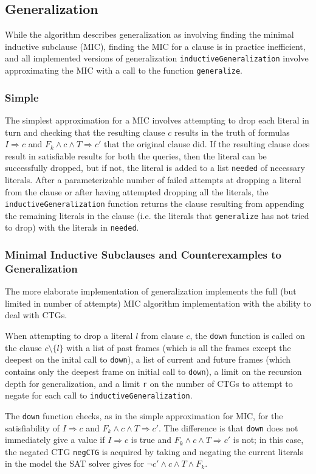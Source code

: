 \documentclass[12pt,a4paper,twoside,openright]{report}
\begin{document}
\subsection{Generalization}
While the algorithm describes generalization as involving finding the minimal inductive subclause (MIC),
finding the MIC for a clause is in practice inefficient, and all implemented versions of generalization
\verb,inductiveGeneralization, involve approximating the MIC with a call to the function
\verb,generalize,.

\subsubsection{Simple}
The simplest approximation for a MIC involves attempting to drop each literal in turn and checking
that the resulting clause $c$ results in the truth of formulas $I \Rightarrow c$ and
$F_k \wedge c \wedge T \Rightarrow c'$ that the original clause did. If the resulting clause
does result in satisfiable results for both the queries, then the literal can be successfully dropped,
but if not, the literal is added to a list \verb,needed, of necessary literals.
After a parameterizable number of failed attempts at dropping a literal from the clause or after
having attempted dropping all the literals, the
\verb,inductiveGeneralization, function returns the clause resulting from appending the remaining
literals in the clause (i.e. the literals that \verb,generalize, has not tried to drop)
with the literals in \verb,needed,.

\subsubsection{Minimal Inductive Subclauses and Counterexamples to Generalization}
The more elaborate implementation of generalization implements the full
(but limited in number of attempts) MIC algorithm implementation with the ability to deal with CTGs.

When attempting to drop a literal $l$ from clause $c$, the \verb,down, function is called on the clause
$c \setminus \{l\}$ with a list of past frames (which is all the frames except the deepest on the inital call
to \verb,down,), a list of current and future frames (which contains only the deepest frame on initial call
to \verb,down,), a limit on the recursion depth for generalization, and a limit \verb,r, on the number
of CTGs to attempt to negate for each call to \verb,inductiveGeneralization,.

The \verb,down, function checks, as in the simple approximation for MIC, for the satisfiability of
$I \Rightarrow c$ and $F_k \wedge c \wedge T \Rightarrow c'$. The difference is that \verb,down,
does not immediately give a value if $I \Rightarrow c$ is true and $F_k \wedge c \wedge T \Rightarrow c'$ is
not; in this case, the negated CTG \verb,negCTG, is acquired by taking and negating the current literals in
the model the SAT solver gives for $\neg c' \wedge c \wedge T \wedge F_k$.
\end{document}
